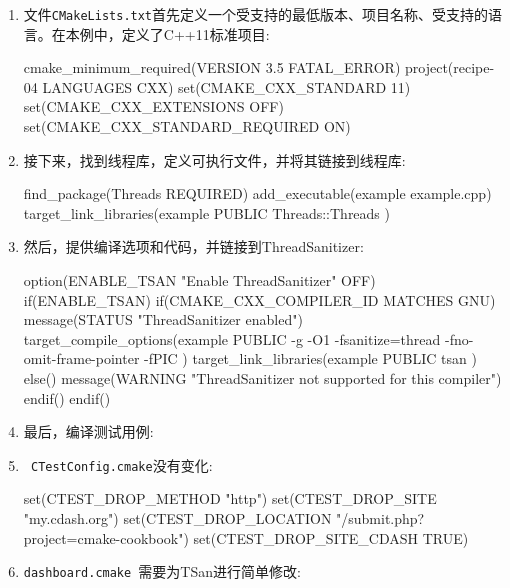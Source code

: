 \begin{enumerate}
\item 文件\texttt{CMakeLists.txt}首先定义一个受支持的最低版本、项目名称、受支持的语言。在本例中，定义了C++11标准项目:

\begin{codebox}[cmake]
cmake_minimum_required(VERSION 3.5 FATAL_ERROR)
project(recipe-04 LANGUAGES CXX)
set(CMAKE_CXX_STANDARD 11)
set(CMAKE_CXX_EXTENSIONS OFF)
set(CMAKE_CXX_STANDARD_REQUIRED ON)
\end{codebox}

\item 接下来，找到线程库，定义可执行文件，并将其链接到线程库:

\begin{codebox}[cmake]
find_package(Threads REQUIRED)
add_executable(example example.cpp)
target_link_libraries(example
  PUBLIC
    Threads::Threads
  )
\end{codebox}

\item 然后，提供编译选项和代码，并链接到ThreadSanitizer:

\begin{codebox}[cmake]
option(ENABLE_TSAN "Enable ThreadSanitizer" OFF)
if(ENABLE_TSAN)
  if(CMAKE_CXX_COMPILER_ID MATCHES GNU)
    message(STATUS "ThreadSanitizer enabled")
    target_compile_options(example
    PUBLIC
        -g -O1 -fsanitize=thread -fno-omit-frame-pointer -fPIC
    )
    target_link_libraries(example
      PUBLIC
        tsan
      )
  else()
    message(WARNING "ThreadSanitizer not supported for this compiler")
  endif()
endif()
\end{codebox}

\item 最后，编译测试用例:


\item \texttt{ CTestConfig.cmake}没有变化:

\begin{codebox}[cmake]
set(CTEST_DROP_METHOD "http")
set(CTEST_DROP_SITE "my.cdash.org")
set(CTEST_DROP_LOCATION "/submit.php?project=cmake-cookbook")
set(CTEST_DROP_SITE_CDASH TRUE)
\end{codebox}

\item \texttt{dashboard.cmake }需要为TSan进行简单修改:


\end{enumerate}
